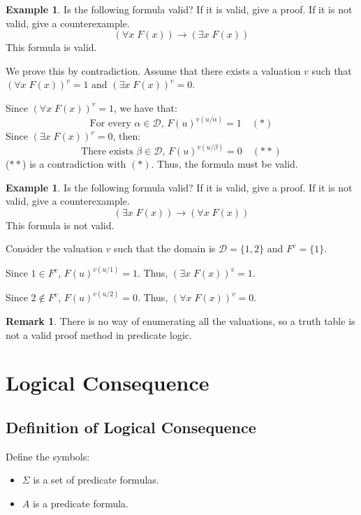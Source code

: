 \documentclass[11pt]{article}
\makeatletter
\theoremstyle{definition}
\newtheorem{exmp}[thm]{Example}
\newtheorem{remark}[thm]{Remark}
\newenvironment{pf}[1][\proofname]{\par
  \pushQED{\qed}%
  \normalfont \topsep0\p@\relax
  \trivlist
  \item[\hskip\labelsep\itshape
  #1\@addpunct{.}]\ignorespaces
}{%
  \popQED\endtrivlist\@endpefalse
}
\makeatother
\begin{document}
\begin{exmp}
Is the following formula valid? If it is valid, give a proof. If it is not valid, give a counterexample.
$$(\forall x \; F(x)) \rightarrow (\exists x \; F(x))$$
This formula is valid.

\begin{pf}
We prove this by contradiction. Assume that there exists a valuation $v$ such that $(\forall x \; F(x))^v = 1$ and $(\exists x \; F(x))^v = 0$.

Since $(\forall x \; F(x))^v = 1$, we have that:
$$\text{For every $\alpha \in \mathcal{D}$, $F(u)^{v(u/\alpha)} = 1$} \quad (*)$$
Since $(\exists x \; F(x))^v = 0$, then:
$$\text{There exists $\beta \in \mathcal{D}$, $F(u)^{v(u/\beta)} = 0$} \quad (**)$$
($**$) is a contradiction with $(*)$. Thus, the formula must be valid.
\end{pf}
\end{exmp} 

\begin{exmp}
Is the following formula valid? If it is valid, give a proof. If it is not valid, give a counterexample.
$$(\exists x \; F(x)) \rightarrow (\forall x \; F(x))$$
This formula is not valid.

Consider the valuation $v$ such that the domain is $\mathcal{D} = \{1, 2\}$ and $F^v = \{1\}$. 

Since $1 \in F^v$, $F(u)^{v(u/1)} = 1$. Thus, $(\exists x \; F(x))^v = 1$.

Since $2 \notin F^v$, $F(u)^{v(u/2)} = 0$. Thus, $(\forall x \; F(x))^v = 0$. 
\end{exmp}

\begin{remark}
There is no way of enumerating all the valuations, so a truth table is not a valid proof method in predicate logic.
\end{remark}

\newpage
\section{Logical Consequence}

\subsection{Definition of Logical Consequence}
Define the symbols:\vspace{-0.25cm}
\begin{itemize}
    \item $\Sigma$ is a set of predicate formulas.
    \item $A$ is a predicate formula.
\end{itemize}
\end{document}

